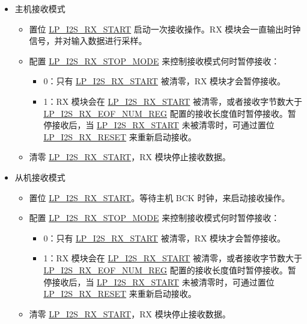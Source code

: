\documentclass[main\_\_CN.tex]{subfiles}
\begin{document}
\begin{itemize}
    \item 主机接收模式
    \begin{itemize}
        \item 置位 \hyperref[fielddesc:LPI2SRXSTART]{LP\_I2S\_RX\_START} 启动一次接收操作。RX 模块会一直输出时钟信号，并对输入数据进行采样。
        \item 配置 \hyperref[fielddesc:LPI2SRXSTOPMODE]{LP\_I2S\_RX\_STOP\_MODE} 来控制接收模式何时暂停接收：
        \begin{itemize}
            \item 0：只有 \hyperref[fielddesc:LPI2SRXSTART]{LP\_I2S\_RX\_START} 被清零，RX 模块才会暂停接收。
            \item 1：RX 模块会在 \hyperref[fielddesc:LPI2SRXSTART]{LP\_I2S\_RX\_START} 被清零，或者接收字节数大于 \hyperref[regdesc:LPI2SRXEOFNUMREG]{LP\_I2S\_RX\_EOF\_NUM\_REG} 配置的接收长度值时暂停接收。暂停接收后，当 \hyperref[fielddesc:LPI2SRXSTART]{LP\_I2S\_RX\_START} 未被清零时，可通过置位 \hyperref[fielddesc:LPI2SRXRESET]{LP\_I2S\_RX\_RESET} 来重新启动接收。
        \end{itemize}
        \item 清零 \hyperref[fielddesc:LPI2SRXSTART]{LP\_I2S\_RX\_START}，RX 模块停止接收数据。
    \end{itemize}
    \item 从机接收模式
    \begin{itemize}
        \item 置位 \hyperref[fielddesc:LPI2SRXSTART]{LP\_I2S\_RX\_START}。等待主机 BCK 时钟，来启动接收操作。
        \item 配置 \hyperref[fielddesc:LPI2SRXSTOPMODE]{LP\_I2S\_RX\_STOP\_MODE} 来控制接收模式何时暂停接收：
        \begin{itemize}
            \item 0：只有 \hyperref[fielddesc:LPI2SRXSTART]{LP\_I2S\_RX\_START} 被清零，RX 模块才会暂停接收。
            \item 1：RX 模块会在 \hyperref[fielddesc:LPI2SRXSTART]{LP\_I2S\_RX\_START} 被清零，或者接收字节数大于 \hyperref[regdesc:LPI2SRXEOFNUMREG]{LP\_I2S\_RX\_EOF\_NUM\_REG} 配置的接收长度值时暂停接收。暂停接收后，当 \hyperref[fielddesc:LPI2SRXSTART]{LP\_I2S\_RX\_START} 未被清零时，可通过置位 \hyperref[fielddesc:LPI2SRXRESET]{LP\_I2S\_RX\_RESET} 来重新启动接收。
        \end{itemize}
        \item 清零 \hyperref[fielddesc:LPI2SRXSTART]{LP\_I2S\_RX\_START}，RX 模块停止接收数据。
    \end{itemize}
\end{itemize}
\end{document}
